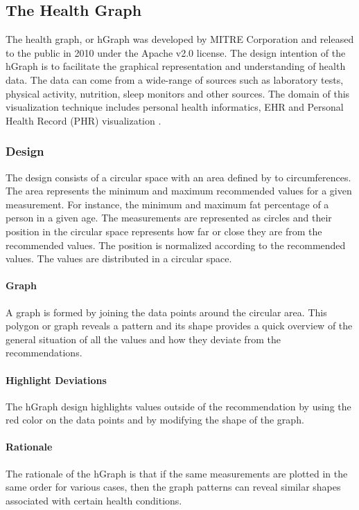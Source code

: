 \documentclass[twocolumn]{bmcart}%
\begin{document}
\subsection*{The Health Graph}

The health graph, or hGraph was developed by MITRE Corporation and released to the public in 2010 under the Apache v2.0 license. The design intention of the hGraph is to facilitate the graphical representation and understanding of health data. The data can come from a wide-range of sources such as laboratory tests, physical activity, nutrition, sleep monitors and other sources. The domain of this visualization technique includes personal health informatics, EHR and Personal Health Record (PHR) visualization \cite{follett2012hgraph}.

\subsubsection*{Design}
The design consists of a circular space with an area defined by to circumferences. The area represents the minimum and maximum recommended values for a given measurement. For instance, the minimum and maximum fat percentage of a person in a given age. The measurements are represented as circles and their position in the circular space represents how far or close they are from the recommended values. The position is normalized according to the recommended values. The values are distributed in a circular space.

\paragraph*{Graph} A graph is formed by joining the data points around the circular area. This polygon or graph reveals a pattern and its shape provides a quick overview of the general situation of all the values and how they deviate from the recommendations.

\paragraph*{Highlight Deviations} The hGraph design highlights values outside of the recommendation by using the red color on the data points and by modifying the shape of the graph.

\paragraph*{Rationale} The rationale of the hGraph is that if the same measurements are plotted in the same order for various cases, then the graph patterns can reveal similar shapes associated with certain health conditions.
\end{document}
